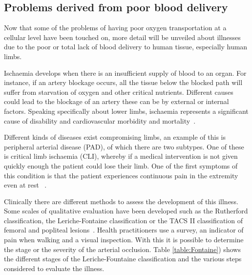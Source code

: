 \subsection{Problems derived from poor blood delivery} %
\label{section literature 4,1}
Now that some of the problems of having poor oxygen transportation at a cellular level have been touched on, more detail will be unveiled about illnesses due to the poor or total lack of blood delivery to human tissue, especially human limbs. 

Ischaemia develops when there is an insufficient supply of blood to an organ. For instance, if an artery blockage occurs, all the tissue below the blocked path will suffer from starvation of oxygen and other critical nutrients. Different causes could lead to the blockage of an artery these can be by external or internal factors. Speaking specifically about lower limbs, ischaemia represents a significant cause of disability and cardiovascular morbidity and mortality~\cite{novo1995patients}.

Different kinds of diseases exist compromising limbs, an example of this is peripheral arterial disease (PAD), of which there are two subtypes. One of these is critical limb ischaemia (CLI), whereby if a medical intervention is not given quickly enough the patient could lose their limb. One of the first symptoms of this condition is that the patient experiences continuous pain in the extremity even at rest ~\cite{novo2004critical}. 

Clinically there are different methods to assess the development of this illness. Some scales of qualitative evaluation have been developed such as the Rutherford classification, the Leriche-Fontaine classification or the TACS II classification of femoral and popliteal lesions~\cite{norgren2007inter}. Health practitioners use a survey, an indicator of pain when walking and a visual inspection. With this it is possible to determine the stage or the severity of the arterial occlusion.  Table \ref{table:Fontaine}) shows the different stages of the Leriche-Fountaine classification and the various steps considered to evaluate the illness.

